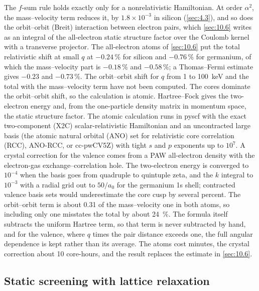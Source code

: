 The $f$-sum rule holds exactly only for a nonrelativistic Hamiltonian. At order $\alpha^2$, the mass--velocity term reduces it, by $1.8\times10^{-3}$ in silicon (\cref{sec:4.3}), and so does the orbit--orbit (Breit) interaction between electron pairs, which \cref{sec:10.6} writes as an integral of the all-electron static structure factor over the Coulomb kernel with a transverse projector. The all-electron atoms of \cref{sec:10.6} put the total relativistic shift at small $q$ at $-0.24\,\%$ for silicon and $-0.76\,\%$ for germanium, of which the mass--velocity part is $-0.18\,\%$ and $-0.58\,\%$; a Thomas--Fermi estimate gives $-0.23$ and $-0.73\,\%$. The orbit--orbit shift for $q$ from 1 to \SI{100}{keV} and the total with the mass--velocity term have not been computed. The cores dominate the orbit--orbit shift, so the calculation is atomic. Hartree--Fock gives the two-electron energy and, from the one-particle density matrix in momentum space, the static structure factor. The atomic calculation runs in pyscf with the exact two-component (X2C) scalar-relativistic Hamiltonian and an uncontracted large basis (the atomic natural orbital (ANO) set for relativistic core correlation (RCC), ANO-RCC, or cc-pwCV5Z) with tight $s$ and $p$ exponents up to $10^7$. A crystal correction for the valence comes from a PAW all-electron density with the electron-gas exchange--correlation hole. The two-electron energy is converged to $10^{-4}$ when the basis goes from quadruple to quintuple zeta, and the $k$ integral to $10^{-3}$ with a radial grid out to $50/a_0$ for the germanium 1s shell; contracted valence basis sets would underestimate the core cusp by several percent. The orbit--orbit term is about 0.31 of the mass--velocity one in both atoms, so including only one misstates the total by about \SI{24}{\percent}. The formula itself subtracts the uniform Hartree term, so that term is never subtracted by hand, and for the valence, where $q$ times the pair distance exceeds one, the full angular dependence is kept rather than its average. The atoms cost minutes, the crystal correction about 10 core-hours, and the result replaces the estimate in \cref{sec:10.6}.

\subsection{Static screening with lattice relaxation}

